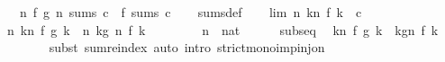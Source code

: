 \begin{isabellebody}
\ \ \ {\isachardoublequoteopen}{\isacharparenleft}{\kern0pt}{\isasymlambda}n{\isachardot}{\kern0pt}\ f\ {\isacharparenleft}{\kern0pt}g\ n{\isacharparenright}{\kern0pt}{\isacharparenright}{\kern0pt}\ sums\ c\ {\isasymlongleftrightarrow}\ f\ sums\ c{\isachardoublequoteclose}\isanewline
%
\isadelimproof
\ \ %
\endisadelimproof
%
\isatagproof
{}\isamarkupfalse%
\ sums{\isacharunderscore}{\kern0pt}def\isanewline
{}\isamarkupfalse%
\isanewline
\ \ \isamarkupfalse%
\ lim{\isacharcolon}{\kern0pt}\ {\isachardoublequoteopen}{\isacharparenleft}{\kern0pt}{\isasymlambda}n{\isachardot}{\kern0pt}\ {\isasymSum}k{\isacharless}{\kern0pt}n{\isachardot}{\kern0pt}\ f\ k{\isacharparenright}{\kern0pt}\ {\isasymlonglonglongrightarrow}\ c{\isachardoublequoteclose}\isanewline
\ \ \isamarkupfalse%
\ {\isachardoublequoteopen}{\isacharparenleft}{\kern0pt}{\isasymlambda}n{\isachardot}{\kern0pt}\ {\isasymSum}k{\isacharless}{\kern0pt}n{\isachardot}{\kern0pt}\ f\ {\isacharparenleft}{\kern0pt}g\ k{\isacharparenright}{\kern0pt}{\isacharparenright}{\kern0pt}\ {\isacharequal}{\kern0pt}\ {\isacharparenleft}{\kern0pt}{\isasymlambda}n{\isachardot}{\kern0pt}\ {\isasymSum}k{\isacharless}{\kern0pt}g\ n{\isachardot}{\kern0pt}\ f\ k{\isacharparenright}{\kern0pt}{\isachardoublequoteclose}\isanewline
\ \ \isamarkupfalse%
\isanewline
\ \ \ \ \isamarkupfalse%
\ n\ {\isacharcolon}{\kern0pt}{\isacharcolon}{\kern0pt}\ nat\isanewline
\ \ \ \ \isamarkupfalse%
\ subseq\ \isamarkupfalse%
\ {\isachardoublequoteopen}{\isacharparenleft}{\kern0pt}{\isasymSum}k{\isacharless}{\kern0pt}n{\isachardot}{\kern0pt}\ f\ {\isacharparenleft}{\kern0pt}g\ k{\isacharparenright}{\kern0pt}{\isacharparenright}{\kern0pt}\ {\isacharequal}{\kern0pt}\ {\isacharparenleft}{\kern0pt}{\isasymSum}k{\isasymin}g{\isacharbackquote}{\kern0pt}{\isacharbraceleft}{\kern0pt}{\isachardot}{\kern0pt}{\isachardot}{\kern0pt}{\isacharless}{\kern0pt}n{\isacharbraceright}{\kern0pt}{\isachardot}{\kern0pt}\ f\ k{\isacharparenright}{\kern0pt}{\isachardoublequoteclose}\isanewline
\ \ \ \ \ \ \isamarkupfalse%
\ {\isacharparenleft}{\kern0pt}subst\ sum{\isachardot}{\kern0pt}reindex{\isacharparenright}{\kern0pt}\ {\isacharparenleft}{\kern0pt}auto\ intro{\isacharcolon}{\kern0pt}\ strict{\isacharunderscore}{\kern0pt}mono{\isacharunderscore}{\kern0pt}imp{\isacharunderscore}{\kern0pt}inj{\isacharunderscore}{\kern0pt}on{\isacharparenright}{\kern0pt}\isanewline
\ \ \ \ \isamarkupfalse%

\end{isabellebody}
